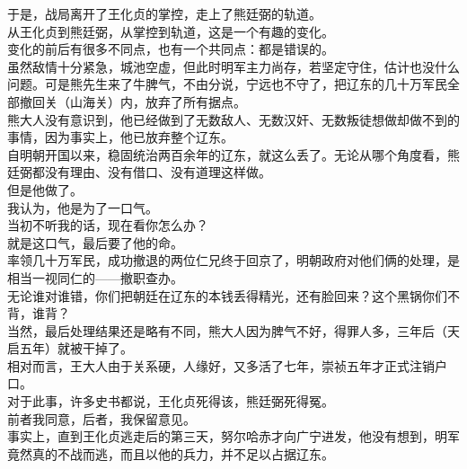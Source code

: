 \begin{multicols}{\theparacolNo}
于是，战局离开了王化贞的掌控，走上了熊廷弼的轨道。\\

从王化贞到熊廷弼，从掌控到轨道，这是一个有趣的变化。\\

变化的前后有很多不同点，也有一个共同点：都是错误的。\\

虽然敌情十分紧急，城池空虚，但此时明军主力尚存，若坚定守住，估计也没什么问题。可是熊先生来了牛脾气，不由分说，宁远也不守了，把辽东的几十万军民全部撤回关（山海关）内，放弃了所有据点。\\

熊大人没有意识到，他已经做到了无数敌人、无数汉奸、无数叛徒想做却做不到的事情，因为事实上，他已放弃整个辽东。\\

自明朝开国以来，稳固统治两百余年的辽东，就这么丢了。无论从哪个角度看，熊廷弼都没有理由、没有借口、没有道理这样做。\\

但是他做了。\\

我认为，他是为了一口气。\\

当初不听我的话，现在看你怎么办？\\

就是这口气，最后要了他的命。\\

率领几十万军民，成功撤退的两位仁兄终于回京了，明朝政府对他们俩的处理，是相当一视同仁的——撤职查办。\\

无论谁对谁错，你们把朝廷在辽东的本钱丢得精光，还有脸回来？这个黑锅你们不背，谁背？\\

当然，最后处理结果还是略有不同，熊大人因为脾气不好，得罪人多，三年后（天启五年）就被干掉了。\\

相对而言，王大人由于关系硬，人缘好，又多活了七年，崇祯五年才正式注销户口。\\

对于此事，许多史书都说，王化贞死得该，熊廷弼死得冤。\\

前者我同意，后者，我保留意见。\\

事实上，直到王化贞逃走后的第三天，努尔哈赤才向广宁进发，他没有想到，明军竟然真的不战而逃，而且以他的兵力，并不足以占据辽东。\\


\end{multicols}
